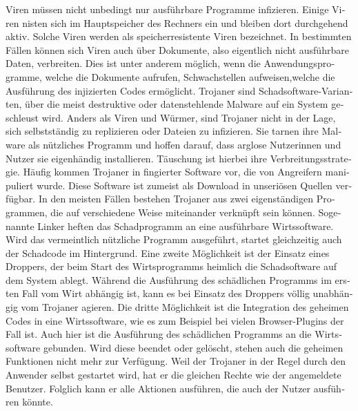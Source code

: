\begin{otherlanguage}{ngerman}
    Viren müssen nicht unbedingt nur ausführbare Programme infizieren. Einige Viren nisten sich
    im Hauptspeicher des Rechners ein und bleiben dort durchgehend aktiv. Solche Viren werden als \dq speicherresistente\dq{} Viren bezeichnet. 
    \newline In bestimmten Fällen können sich Viren auch über Dokumente, also eigentlich nicht ausführbare Daten, verbreiten. Dies ist unter anderem möglich, wenn die Anwendungsprogramme, welche die Dokumente aufrufen, Schwachstellen aufweisen,welche die Ausführung des injizierten Codes ermöglicht.
    \label{Trojaner}
    \newline Trojaner sind  Schadsoftware-Varianten, über die meist destruktive oder datenstehlende Malware auf ein System geschleust wird. Anders als Viren und Würmer, sind Trojaner nicht in der Lage, sich selbstständig zu replizieren oder Dateien zu infizieren.
    Sie tarnen ihre Malware als nützliches Programm und hoffen darauf, dass arglose Nutzerinnen und Nutzer sie eigenhändig installieren. Täuschung ist hierbei ihre Verbreitungsstrategie. Häufig kommen Trojaner in fingierter Software vor, die von Angreifern manipuliert wurde. Diese Software ist zumeist als Download in unseriösen Quellen verfügbar.
    \newline In den meisten Fällen bestehen Trojaner aus zwei eigenständigen Programmen, die auf verschiedene Weise miteinander verknüpft sein können. Sogenannte Linker heften das Schadprogramm an eine ausführbare Wirtssoftware. Wird das vermeintlich nützliche Programm ausgeführt, startet gleichzeitig auch der Schadcode im Hintergrund.
    \newline Eine zweite Möglichkeit ist der Einsatz eines Droppers, der beim Start des Wirtsprogramms heimlich die Schadsoftware auf dem System ablegt. Während die Ausführung des schädlichen Programms im ersten Fall vom Wirt abhängig ist, kann es bei Einsatz des Droppers völlig unabhängig vom Trojaner agieren. 
    \newline Die dritte Möglichkeit ist die Integration des geheimen Codes in eine Wirtssoftware, wie es zum Beispiel bei vielen Browser-Plugins der Fall ist. Auch hier ist die Ausführung des schädlichen Programms an die Wirtssoftware gebunden. Wird diese beendet oder gelöscht, stehen auch die geheimen Funktionen nicht mehr zur Verfügung.
    \newline Weil der Trojaner in der Regel durch den Anwender selbst gestartet wird, hat er die gleichen Rechte wie der angemeldete Benutzer. Folglich kann er alle Aktionen ausführen, die auch der Nutzer ausführen könnte.
    

\end{otherlanguage}
